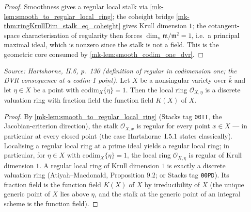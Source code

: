 \begin{proof}
  Smoothness gives a regular local stalk via
  \ref{mk-lem:smooth_to_regular_local_ring}; the coheight bridge
  \ref{mk-thm:ringKrullDim_stalk_eq_coheight} gives Krull dimension \(1\); the
  cotangent-space characterisation of regularity then forces
  \(\dim_\kappa \mathfrak m/\mathfrak m^2 = 1\), i.e.\ a principal maximal ideal, which
  is nonzero since the stalk is not a field. This is the geometric core consumed by
  \ref{mk-lem:smooth_codim_one_dvr}.
\end{proof}

\begin{lemma}\label{mk-lem:smooth_codim_one_dvr}
  \leanok

  \textit{Source: Hartshorne, II.6, p.~130 (definition of regular in codimension one;
  the DVR consequence at a codim-1 point).}
  Let \(X\) be a nonsingular variety over \(\bar k\) and let \(\eta \in X\) be a point with
  \(\mathrm{codim}_X \overline{\{\eta\}} = 1\). Then the local ring \(\mathcal O_{X, \eta}\) is a
  discrete valuation ring with fraction field the function field \(K(X)\) of \(X\).
\end{lemma}

\begin{proof}

  By \ref{mk-lem:smooth_to_regular_local_ring} (Stacks tag \texttt{00TT}, the
  Jacobian-criterion direction), the stalk \(\mathcal O_{X, x}\) is regular for
  every point \(x \in X\) --- in particular at every closed point (the case
  Hartshorne~I.5.1 states classically). Localising a regular local ring at a
  prime ideal yields a regular local ring; in particular, for \(\eta \in X\) with
  \(\mathrm{codim}_X \overline{\{\eta\}} = 1\), the local ring
  \(\mathcal O_{X, \eta}\) is regular of Krull dimension \(1\). A regular local ring of Krull dimension \(1\) is exactly a
  discrete valuation ring (Atiyah--Macdonald, Proposition 9.2; or Stacks tag
  \texttt{00PD}). Its fraction field is the function field \(K(X)\) of \(X\) by
  irreducibility of \(X\) (the unique generic point of \(X\) lies above \(\eta\), and the
  stalk at the generic point of an integral scheme is the function field).
\end{proof}

